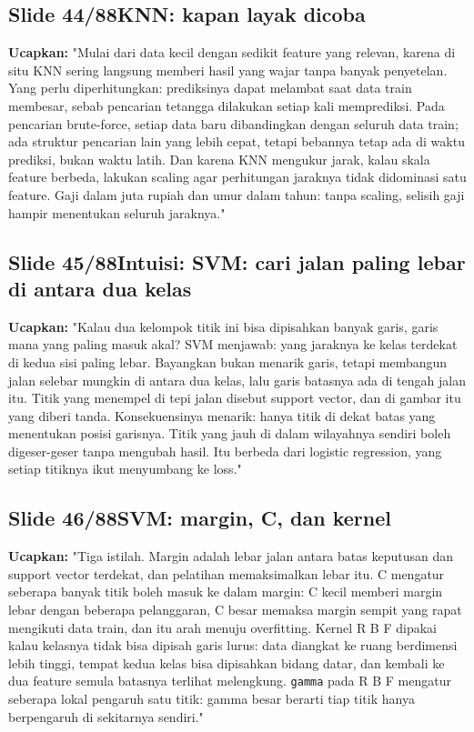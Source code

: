 \documentclass[11pt]{article}
\renewcommand{\framebox}[1]{\colorbox{acc!15}{\textcolor{acc}{\textbf{#1}}}}
\begin{document}
\subsection*{\framebox{Slide 44/88}\quad KNN: kapan layak dicoba}
\textbf{Ucapkan:} "Mulai dari data kecil dengan sedikit feature yang relevan, karena di situ KNN sering langsung memberi hasil yang wajar tanpa banyak penyetelan. Yang perlu diperhitungkan: prediksinya dapat melambat saat data train membesar, sebab pencarian tetangga dilakukan setiap kali memprediksi. Pada pencarian brute-force, setiap data baru dibandingkan dengan seluruh data train; ada struktur pencarian lain yang lebih cepat, tetapi bebannya tetap ada di waktu prediksi, bukan waktu latih. Dan karena KNN mengukur jarak, kalau skala feature berbeda, lakukan scaling agar perhitungan jaraknya tidak didominasi satu feature. Gaji dalam juta rupiah dan umur dalam tahun: tanpa scaling, selisih gaji hampir menentukan seluruh jaraknya."\\[2pt]

\subsection*{\framebox{Slide 45/88}\quad Intuisi: SVM: cari jalan paling lebar di antara dua kelas}
\textbf{Ucapkan:} "Kalau dua kelompok titik ini bisa dipisahkan banyak garis, garis mana yang paling masuk akal? SVM menjawab: yang jaraknya ke kelas terdekat di kedua sisi paling lebar. Bayangkan bukan menarik garis, tetapi membangun jalan selebar mungkin di antara dua kelas, lalu garis batasnya ada di tengah jalan itu. Titik yang menempel di tepi jalan disebut support vector, dan di gambar itu yang diberi tanda. Konsekuensinya menarik: hanya titik di dekat batas yang menentukan posisi garisnya. Titik yang jauh di dalam wilayahnya sendiri boleh digeser-geser tanpa mengubah hasil. Itu berbeda dari logistic regression, yang setiap titiknya ikut menyumbang ke loss."\\[2pt]

\subsection*{\framebox{Slide 46/88}\quad SVM: margin, C, dan kernel}
\textbf{Ucapkan:} "Tiga istilah. Margin adalah lebar jalan antara batas keputusan dan support vector terdekat, dan pelatihan memaksimalkan lebar itu. C mengatur seberapa banyak titik boleh masuk ke dalam margin: C kecil memberi margin lebar dengan beberapa pelanggaran, C besar memaksa margin sempit yang rapat mengikuti data train, dan itu arah menuju overfitting. Kernel R B F dipakai kalau kelasnya tidak bisa dipisah garis lurus: data diangkat ke ruang berdimensi lebih tinggi, tempat kedua kelas bisa dipisahkan bidang datar, dan kembali ke dua feature semula batasnya terlihat melengkung. \texttt{gamma} pada R B F mengatur seberapa lokal pengaruh satu titik: gamma besar berarti tiap titik hanya berpengaruh di sekitarnya sendiri."\\[2pt]
\end{document}
